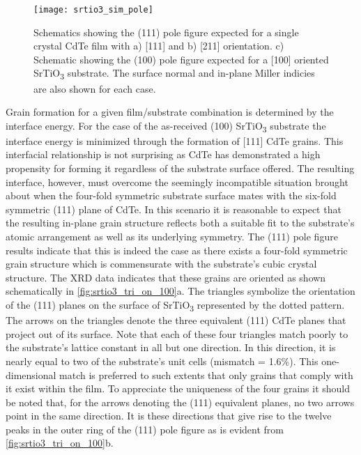 \begin{figure}
 \centering \texttt{[image: srtio3\_sim\_pole]}
 \caption[Simulated pole figures of CdTe on SrTiO\(_3\) surfaces]{\label{fig:srtio3_sim_pole}Schematics showing the (111) pole figure expected for a single crystal CdTe film with a) [111] and b) [211] orientation.
  c) Schematic showing the (100) pole figure expected for a [100] oriented SrTiO\textsubscript{3} substrate.
  The surface normal and in-plane Miller indicies are also shown for each case.}
\end{figure}

Grain formation for a given film/substrate combination is determined by the interface energy.
For the case of the as-received (100) SrTiO\textsubscript{3} substrate the interface energy is minimized through the formation of [111] CdTe grains.
This interfacial relationship is not surprising as CdTe has demonstrated a high propensity for forming it regardless of the substrate surface offered\cite{Neretina2006}.
The resulting interface, however, must overcome the seemingly incompatible situation brought about when the four-fold symmetric substrate surface mates with the six-fold symmetric (111) plane of CdTe.
In this scenario it is reasonable to expect that the resulting in-plane grain structure reflects both a suitable fit to the substrate’s atomic arrangement as well as its underlying symmetry.
The (111) pole figure results indicate that this is indeed the case as there exists a four-fold symmetric grain structure which is commensurate with the substrate’s cubic crystal structure.
The XRD data indicates that these grains are oriented as shown schematically in \cref{fig:srtio3_tri_on_100}a.
The triangles symbolize the orientation of the (111) planes on the surface of SrTiO\textsubscript{3} represented by the dotted pattern.
The arrows on the triangles denote the three equivalent (111) CdTe planes that project out of its surface.
Note that each of these four triangles match poorly to the substrate’s lattice constant in all but one direction.
In this direction, it is nearly equal to two of the substrate’s unit cells (mismatch = 1.6\%).
This
one-dimensional match is preferred to such extents that only grains that comply with it exist within the film.
To appreciate the uniqueness of the four grains it should be noted that, for the arrows denoting the (111) equivalent planes, no two arrows point in the same direction.
It is these directions that give rise to the twelve peaks in the outer ring of the (111) pole figure as is evident from \cref{fig:srtio3_tri_on_100}b.
